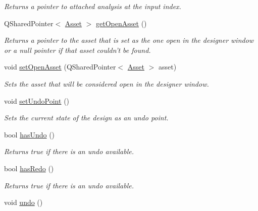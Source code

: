 \begin{DoxyCompactItemize}
\begin{DoxyCompactList}\small\item\em Returns a pointer to attached analysis at the input index. \end{DoxyCompactList}\item 
\hypertarget{class_picto_1_1_design_root_a4a09a16a474d26bf762b5dfad70f4c3a}{Q\-Shared\-Pointer$<$ \hyperlink{class_picto_1_1_asset}{Asset} $>$ \hyperlink{class_picto_1_1_design_root_a4a09a16a474d26bf762b5dfad70f4c3a}{get\-Open\-Asset} ()}\label{class_picto_1_1_design_root_a4a09a16a474d26bf762b5dfad70f4c3a}

\begin{DoxyCompactList}\small\item\em Returns a pointer to the asset that is set as the one open in the designer window or a null pointer if that asset couldn't be found. \end{DoxyCompactList}\item 
void \hyperlink{class_picto_1_1_design_root_ab0e486681130b2fc354308dd6c19df6e}{set\-Open\-Asset} (Q\-Shared\-Pointer$<$ \hyperlink{class_picto_1_1_asset}{Asset} $>$ asset)
\begin{DoxyCompactList}\small\item\em Sets the asset that will be considered open in the designer window. \end{DoxyCompactList}\item 
void \hyperlink{class_picto_1_1_design_root_a0be90b8e58e958fea095f0650f865c46}{set\-Undo\-Point} ()
\begin{DoxyCompactList}\small\item\em Sets the current state of the design as an undo point. \end{DoxyCompactList}\item 
bool \hyperlink{class_picto_1_1_design_root_aed754dcf76ca7ae16f30745f0a895758}{has\-Undo} ()
\begin{DoxyCompactList}\small\item\em Returns true if there is an undo available. \end{DoxyCompactList}\item 
bool \hyperlink{class_picto_1_1_design_root_a75959f40e084a4b5a0476cee21fee410}{has\-Redo} ()
\begin{DoxyCompactList}\small\item\em Returns true if there is an undo available. \end{DoxyCompactList}\item 
void \hyperlink{class_picto_1_1_design_root_a8f57a2f9ebb4fd5065a6f36b4d8a4b90}{undo} ()

\end{DoxyCompactItemize}
